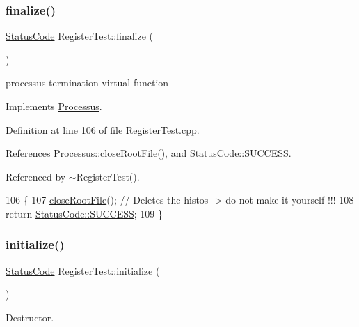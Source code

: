 \subsubsection{\texorpdfstring{finalize()}{finalize()}}
{\footnotesize\ttfamily \hyperlink{classStatusCode}{Status\+Code} Register\+Test\+::finalize (\begin{DoxyParamCaption}{ }\end{DoxyParamCaption})\hspace{0.3cm}{\ttfamily [virtual]}}

processus termination virtual function 

Implements \hyperlink{classProcessus_aba93d691f031bdb18ae4b8afb1b2e856}{Processus}.



Definition at line 106 of file Register\+Test.\+cpp.



References Processus\+::close\+Root\+File(), and Status\+Code\+::\+S\+U\+C\+C\+E\+SS.



Referenced by $\sim$\+Register\+Test().


\begin{DoxyCode}
106                                     \{
107   \hyperlink{classProcessus_a2f3c41e99da4c738ea3d8f7b0d20a665}{closeRootFile}(); \textcolor{comment}{// Deletes the histos -> do not make it yourself !!!}
108   \textcolor{keywordflow}{return} \hyperlink{classStatusCode_a6f565cbeadc76d14c72f047e5e85eb4badd0da38d3ba0d922efd1f4619bc37ad8}{StatusCode::SUCCESS};
109 \}
\end{DoxyCode}
\mbox{\label{classRegisterTest_a77354dcd379c33deae6b713a1ba697b5}} 
\subsubsection{\texorpdfstring{initialize()}{initialize()}}
{\footnotesize\ttfamily \hyperlink{classStatusCode}{Status\+Code} Register\+Test\+::initialize (\begin{DoxyParamCaption}{ }\end{DoxyParamCaption})\hspace{0.3cm}{\ttfamily [virtual]}}



Destructor. 



